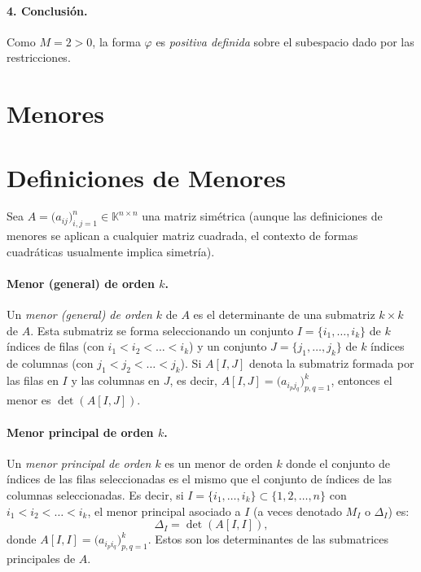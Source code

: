 \documentclass{article}
\begin{document}
\paragraph*{4. Conclusión.}  
Como \(M=2>0\), la forma \(\varphi\) es \emph{positiva definida} sobre el subespacio dado por las restricciones.


\newpage

\section{Menores}

\section*{Definiciones de Menores}

Sea $A = \bigl(a_{ij}\bigr)_{i,j=1}^n \in \mathbb{K}^{n\times n}$ una matriz simétrica (aunque las definiciones de menores se aplican a cualquier matriz cuadrada, el contexto de formas cuadráticas usualmente implica simetría).

\paragraph{Menor (general) de orden $k$.}
Un \emph{menor (general) de orden $k$} de $A$ es el determinante de una submatriz $k \times k$ de $A$. Esta submatriz se forma seleccionando un conjunto $I = \{i_1, \dots, i_k\}$ de $k$ índices de filas (con $i_1 < i_2 < \dots < i_k$) y un conjunto $J = \{j_1, \dots, j_k\}$ de $k$ índices de columnas (con $j_1 < j_2 < \dots < j_k$). Si $A[I,J]$ denota la submatriz formada por las filas en $I$ y las columnas en $J$, es decir, $A[I,J] = \bigl(a_{i_p j_q}\bigr)_{p,q=1}^k$, entonces el menor es $\det(A[I,J])$.

\paragraph{Menor principal de orden $k$.}
Un \emph{menor principal de orden $k$} es un menor de orden $k$ donde el conjunto de índices de las filas seleccionadas es el mismo que el conjunto de índices de las columnas seleccionadas.
Es decir, si $I = \{i_1, \dots, i_k\} \subset \{1, 2, \dots, n\}$ con $i_1 < i_2 < \dots < i_k$, el menor principal asociado a $I$ (a veces denotado $M_I$ o $\Delta_I$) es:
\[
\Delta_I = \det(A[I,I]),
\]
donde $A[I,I] = \bigl(a_{i_p i_q}\bigr)_{p,q=1}^k$. Estos son los determinantes de las submatrices principales de $A$.
\end{document}
